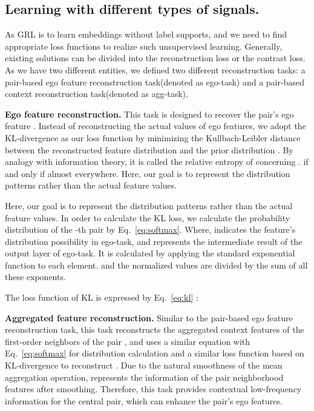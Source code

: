 \documentclass[10pt,journal,compsoc]{IEEEtran}
\begin{document}
\subsection{Learning with different types of signals.} As GRL is to learn embeddings without label supports, and we need to find appropriate loss functions to realize such unsupervised learning. Generally, existing solutions can be divided into the reconstruction loss\cite{Veli17_GAT} or the contrast loss\cite{hamilton_grapshsage, Veli18_dgi}. As we have two different entities, we defined two different reconstruction tasks: a pair-based ego feature reconstruction task(denoted as ego-task) and a pair-based context reconstruction task(denoted as agg-task).
   
 \noindent\textbf{Ego feature reconstruction.} This task is designed to recover the pair's ego feature . Instead of reconstructing the actual values of ego features, we adopt the KL-divergence as our loss function by minimizing the Kullbach-Leibler distance  between the reconstructed feature distribution  and the prior distribution . By analogy with information theory, it is called the relative entropy of  concerning  .   if and only if  almost everywhere. Here, our goal is to represent the distribution patterns rather than the actual feature values. 
 
 Here, our goal is to represent the distribution patterns rather than the actual feature values. In order to calculate the KL loss, we calculate the probability distribution of the -th pair by Eq.~\ref{eq:softmax}. Where,  indicates the  feature's distribution possibility in ego-task, and  represents the intermediate result of the output layer of ego-task. It is calculated by applying the standard exponential function to each element.  and the normalized values are divided by the sum of all these exponents.
 
     

    
    The loss function of KL is expressed by Eq.~\ref{eq:kl} :
    


    


 \noindent\textbf{Aggregated feature reconstruction.}
 Similar to the pair-based ego feature reconstruction task, this task reconstructs the aggregated context features of the first-order neighbors  of the pair , and uses a similar equation with Eq.~\ref{eq:softmax} for distribution calculation and a similar loss function based on KL-divergence to reconstruct . Due to the natural smoothness of the mean aggregation operation,  represents the information of the pair neighborhood features after smoothing. Therefore, this task provides contextual low-frequency information for the central pair, which can enhance the pair's ego features.
 
\end{document}
